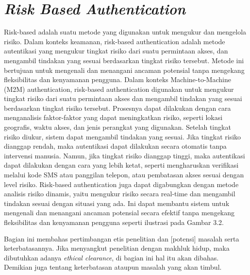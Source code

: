 \section{\textit{Risk Based Authentication}}
Risk-based adalah suatu metode yang digunakan untuk mengukur dan
mengelola risiko. Dalam konteks keamanan, risk-based authentication adalah metode autentikasi yang mengukur tingkat risiko dari suatu permintaan akses, dan mengambil tindakan yang sesuai berdasarkan tingkat risiko tersebut. Metode ini bertujuan untuk mengenali dan menangani ancaman potensial tanpa mengekang fleksibilitas dan kenyamanan pengguna.
Dalam konteks Machine-to-Machine (M2M) authentication, risk-based authentication digunakan untuk mengukur tingkat risiko dari suatu permintaan akses dan mengambil tindakan yang sesuai berdasarkan tingkat risiko tersebut.
Prosesnya dapat dilakukan dengan cara menganalisis faktor-faktor yang dapat meningkatkan risiko, seperti lokasi geografis, waktu akses, dan jenis perangkat yang digunakan.
Setelah tingkat risiko diukur, sistem dapat mengambil tindakan yang sesuai. Jika tingkat risiko dianggap rendah, maka autentikasi dapat dilakukan secara otomatis tanpa intervensi manusia. Namun, jika tingkat risiko dianggap tinggi, maka autentikasi dapat dilakukan dengan cara yang lebih ketat, seperti mengharuskan verifikasi melalui kode SMS atau panggilan telepon, atau pembatasan akses sesuai dengan level risiko.
Risk-based authentication juga dapat digabungkan dengan metode analisis risiko dinamis, yaitu mengukur risiko secara real-time dan mengambil tindakan sesuai dengan situasi yang ada. Ini dapat membantu sistem untuk mengenali dan menangani ancaman potensial secara efektif tanpa mengekang fleksibilitas dan kenyamanan pengguna seperti ilustrasi pada Gambar 3.2.

Bagian ini membahas pertimbangan etis penelitian dan [potensi] masalah serta
keterbatasannya. Jika menyangkut penelitian dengan makhluk hidup, maka dibutuhkan adanya \textit{ethical clearance}, di bagian ini hal itu akan dibahas. Demikian juga tentang keterbatasan ataupun masalah yang akan timbul.

